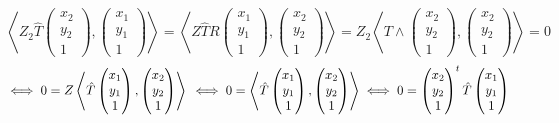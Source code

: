 \documentclass[../main.tex]{subfiles}
\begin{document}
	\begin{displaymath}
		\left\langle Z_2\hat{T}\begin{pmatrix}
			x_2\\y_2\\1
		\end{pmatrix}, \begin{pmatrix}
			x_1\\y_1\\1
		\end{pmatrix}
		\right\rangle
		=
		\left\langle Z\hat{T}R\begin{pmatrix}
			x_1\\y_1\\1
		\end{pmatrix}, \begin{pmatrix}
			x_2\\y_2\\1
		\end{pmatrix}
		\right\rangle = Z_2\left\langle T\wedge\begin{pmatrix}
			x_2\\y_2\\1
		\end{pmatrix}, \begin{pmatrix}
			x_2\\y_2\\1
		\end{pmatrix}\right\rangle = 0
	\end{displaymath}
	\begin{displaymath}
		\iff 0 = Z\left\langle \hat{T}\begin{pmatrix}
			x_1\\y_1\\1
		\end{pmatrix},
		\begin{pmatrix}
			x_2\\y_2\\1
		\end{pmatrix}
		\right\rangle\\
		\iff 0 = \left\langle \hat{T}\begin{pmatrix}
			x_1\\y_1\\1
		\end{pmatrix},
		\begin{pmatrix}
			x_2\\y_2\\1
		\end{pmatrix}
		\right\rangle
		\iff 0 = \begin{pmatrix}
			x_2\\y_2\\1
		\end{pmatrix}^t \hat{T}\begin{pmatrix}
			x_1\\y_1\\1
		\end{pmatrix}
	\end{displaymath}
\end{document}

